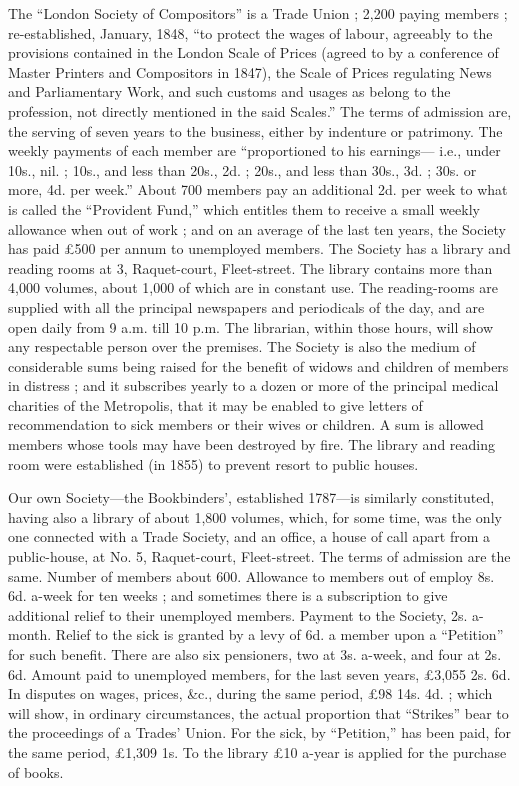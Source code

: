 The ``London Society of Compositors'' is a Trade Union ; 2,200
paying members ; re-established, January, 1848, ``to protect the wages
of labour, agreeably to the provisions contained in the London Scale of
Prices (agreed to by a conference of Master Printers and Compositors in
1847), the Scale of Prices regulating News and Parliamentary Work, and
such customs and usages as belong to the profession, not directly
mentioned in the said Scales.'' The terms of admission are, the serving
of seven years to the business, either by indenture or patrimony. The
weekly payments of each member are ``proportioned to his earnings---
i.e., under 10s., nil. ; 10s., and less than 20s., 2d. ; 20s., and
less than 30s., 3d. ; 30s. or more, 4d. per week.'' About 700 members
pay an additional 2d. per week to what is called the ``Provident Fund,''
which entitles them to receive a small weekly allowance when out of work
; and on an average of the last ten years, the Society has paid £500 per
annum to unemployed members. The Society has a library and reading rooms
at 3, Raquet-court, Fleet-street. The library contains more than 4,000
volumes, about 1,000 of which are in constant use. The reading-rooms are
supplied with all the principal newspapers and periodicals of the day,
and are open daily from 9 a.m. till 10 p.m. The librarian, within those
hours, will show any respectable person over the premises. The Society is
also the medium of considerable sums being raised for the benefit of
widows and children of members in distress ; and it subscribes yearly to
a dozen or more of the principal medical charities of the Metropolis,
that it may be enabled to give letters of recommendation to sick members
or their wives or children. A sum is allowed members whose tools may
have been destroyed by fire. The library and reading room were
established (in 1855) to prevent resort to public houses.

Our own Society---the Bookbinders', established 1787---is similarly
constituted, having also a library of about 1,800 volumes, which, for
some time, was the only one connected with a Trade Society, and an
office, a house of call apart from a public-house, at No. 5,
Raquet-court, Fleet-street. The terms of admission are the same. Number
of members about 600. Allowance to members out of employ 8s. 6d. a-week
for ten weeks ; and sometimes there is a subscription to give additional
relief to their unemployed members. Payment to the Society, 2s. a-month.
Relief to the sick is granted by a levy of 6d. a member upon a
``Petition'' for such benefit. There are also six pensioners, two at 3s.
a-week, and four at 2s. 6d. Amount paid to unemployed members, for the
last seven years, £3,055 2s. 6d. In disputes on wages, prices, \&c.,
during the same period, £98 14s. 4d. ; which will show, in ordinary
circumstances, the actual proportion that ``Strikes'' bear to the
proceedings of a Trades' Union. For the sick, by ``Petition,'' has been
paid, for the same period, £1,309 1s. To the library £10 a-year is
applied for the purchase of books.

